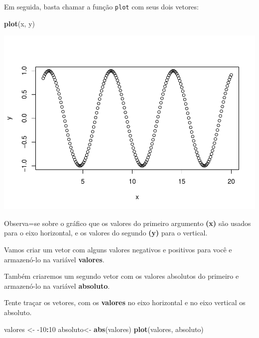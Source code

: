 \documentclass[]{book}
\newenvironment{Shaded}{\begin{snugshade}}{\end{snugshade}}
\newcommand{\DecValTok}[1]{\textcolor[rgb]{0.00,0.00,0.81}{#1}}
\newcommand{\KeywordTok}[1]{\textcolor[rgb]{0.13,0.29,0.53}{\textbf{#1}}}
\newcommand{\NormalTok}[1]{#1}
\newcommand{\OperatorTok}[1]{\textcolor[rgb]{0.81,0.36,0.00}{\textbf{#1}}}
\newcommand{\StringTok}[1]{\textcolor[rgb]{0.31,0.60,0.02}{#1}}
\begin{document}
Em seguida, basta chamar a função \texttt{plot} com seus dois vetores:

\begin{Shaded}
\begin{Highlighting}[]
\KeywordTok{plot}\NormalTok{(x, y)}
\end{Highlighting}
\end{Shaded}

\includegraphics{TudodoR_files/figure-latex/unnamed-chunk-46-1.pdf}

Observa=se sobre o gráfico que os valores do primeiro argumento \textbf{(x)} são usados para o eixo horizontal, e os valores do segundo \textbf{(y)} para o vertical.

Vamos criar um vetor com alguns valores negativos e positivos para você e armazenó-lo na variável \textbf{valores}.

Também criaremos um segundo vetor com os valores absolutos do primeiro e armazenó-lo na variável \textbf{absoluto}.

Tente traçar os vetores, com os \textbf{valores} no eixo horizontal e no eixo vertical os absoluto.

\begin{Shaded}
\begin{Highlighting}[]
\NormalTok{valores <-}\StringTok{ }\DecValTok{-10}\OperatorTok{:}\DecValTok{10}
\NormalTok{absoluto<-}\StringTok{ }\KeywordTok{abs}\NormalTok{(valores)}
\KeywordTok{plot}\NormalTok{(valores, absoluto)}
\end{Highlighting}
\end{Shaded}
\end{document}

